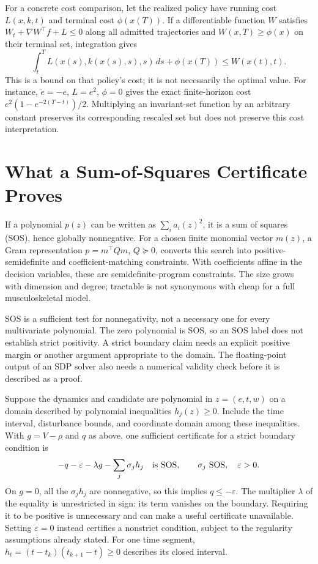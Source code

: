 For a concrete cost comparison, let the realized policy have running cost $L(x,k,t)$ and terminal cost $\phi(x(T))$. If a differentiable function $W$ satisfies $W_t+\nabla W^\top f+L\leq0$ along all admitted trajectories and $W(x,T)\geq\phi(x)$ on their terminal set, integration gives
\begin{equation}
 \int_t^T L(x(s),k(x(s),s),s)\,ds+\phi(x(T))\leq W(x(t),t).
 \label{eq:funnel_cost_comparison}
\end{equation}
This is a bound on that policy's cost; it is not necessarily the optimal value. For instance, $\dot e=-e$, $L=e^2$, $\phi=0$ gives the exact finite-horizon cost $e^2(1-e^{-2(T-t)})/2$. Multiplying an invariant-set function by an arbitrary constant preserves its corresponding rescaled set but does not preserve this cost interpretation.

\section{What a Sum-of-Squares Certificate Proves}

If a polynomial $p(z)$ can be written as $\sum_i a_i(z)^2$, it is a sum of squares (SOS), hence globally nonnegative. For a chosen finite monomial vector $m(z)$, a Gram representation $p=m^\top Qm$, $Q\succeq0$, converts this search into positive-semidefinite and coefficient-matching constraints. With coefficients affine in the decision variables, these are semidefinite-program constraints. The size grows with dimension and degree; tractable is not synonymous with cheap for a full musculoskeletal model.

SOS is a sufficient test for nonnegativity, not a necessary one for every multivariate polynomial. The zero polynomial is SOS, so an SOS label does not establish strict positivity. A strict boundary claim needs an explicit positive margin or another argument appropriate to the domain. The floating-point output of an SDP solver also needs a numerical validity check before it is described as a proof.

Suppose the dynamics and candidate are polynomial in $z=(e,t,w)$ on a domain described by polynomial inequalities $h_j(z)\geq0$. Include the time interval, disturbance bounds, and coordinate domain among these inequalities. With $g=V-\rho$ and $q$ as above, one sufficient certificate for a strict boundary condition is
\begin{equation}
 -q-\varepsilon-\lambda g-\sum_j\sigma_jh_j\quad\hbox{is SOS},
 \qquad \sigma_j\ \hbox{SOS},\quad\varepsilon>0.
 \label{eq:funnel_sos_certificate}
\end{equation}
On $g=0$, all the $\sigma_jh_j$ are nonnegative, so this implies $q\leq-\varepsilon$. The multiplier $\lambda$ of the equality is unrestricted in sign: its term vanishes on the boundary. Requiring it to be positive is unnecessary and can make a useful certificate unavailable. Setting $\varepsilon=0$ instead certifies a nonstrict condition, subject to the regularity assumptions already stated. For one time segment, $h_t=(t-t_k)(t_{k+1}-t)\geq0$ describes its closed interval.

